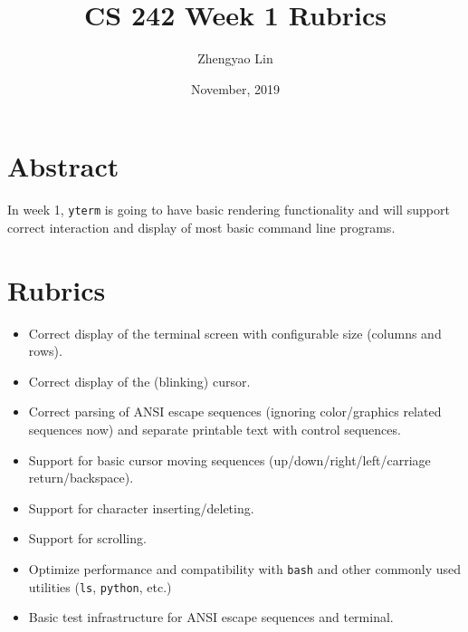 \documentclass[11pt]{article}
\begin{document}
    \title{CS 242 Week 1 Rubrics}
    \author{Zhengyao Lin}
    \date{November, 2019}
    \maketitle
    
    \section{Abstract}
        In week 1, \texttt{yterm} is going to have basic rendering functionality and will support correct interaction and display of most basic command line programs.
    
    \section{Rubrics}
        \begin{itemize}
            \item Correct display of the terminal screen with configurable size (columns and rows).
            \item Correct display of the (blinking) cursor.
            \item Correct parsing of ANSI escape sequences (ignoring color/graphics related sequences now) and separate printable text with control sequences.
            \item Support for basic cursor moving sequences (up/down/right/left/carriage return/backspace).
            \item Support for character inserting/deleting.
            \item Support for scrolling.
            \item Optimize performance and compatibility with \texttt{bash} and other commonly used utilities (\texttt{ls}, \texttt{python}, etc.)
            \item Basic test infrastructure for ANSI escape sequences and terminal.
        \end{itemize}
\end{document}
